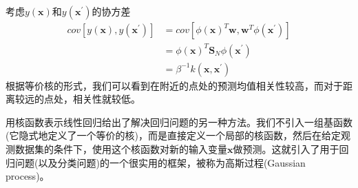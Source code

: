 考虑$y(\boldsymbol{x})$和$y(\boldsymbol{x^{'}})$的协方差
\begin{equation}
	\begin{aligned}
	cov[y(\boldsymbol{x}),y(\boldsymbol{x^{'}})]&=cov[\phi(\boldsymbol{x})^T\boldsymbol{w},\boldsymbol{w}^T\phi(\boldsymbol{x^{'}})]\\
	&=\phi(\boldsymbol{x})^T\boldsymbol{S}_N\phi(\boldsymbol{x^{'}})\\
	&=\beta^{-1}k(\boldsymbol{x},\boldsymbol{x^{'}})
	\end{aligned}
\end{equation}
根据等价核的形式，我们可以看到在附近的点处的预测均值相关性较高，而对于距离较远的点处，相关性就较低。

用核函数表示线性回归给出了解决回归问题的另一种方法。我们不引入一组基函数(它隐式地定义了一个等价的核)，而是直接定义一个局部的核函数，然后在给定观测数据集的条件下，使用这个核函数对新的输入变量$\boldsymbol{x}$做预测。这就引入了用于回归问题(以及分类问题)的一个很实用的框架，被称为高斯过程(Gaussian process)。